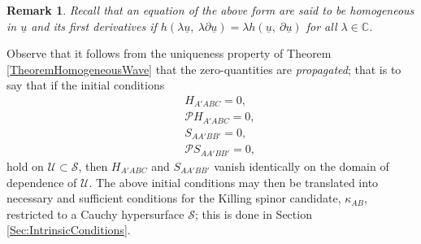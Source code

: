 \documentclass[10pt,a4paper]{article}
\theoremstyle{plain}
\newtheorem{remark}{Remark}
\begin{document}
\begin{remark}
\emph{ Recall that an equation of the
above form are said to be \textit{homogeneous in} $\underline{u}$
\textit{and its first derivatives} if
$h\left(\lambda\underline{u},~\lambda\partial\underline{u}\right)=\lambda
h\left(\underline{u},~\partial\underline{u}\right)$ for all
$\lambda\in\mathbb{C}$. }
\end{remark}

Observe that  it follows from the
uniqueness property of Theorem \ref{TheoremHomogeneousWave} that the
zero-quantities are \emph{propagated}; that is to say that if the
initial conditions
\begin{eqnarray*}
&& H_{A'ABC}=0,\\ && \mathcal{P} H_{A'ABC}=0,\\ &&
  S_{AA'BB'}=0,\\ &&\mathcal{P} S_{AA'BB'}=0,
\end{eqnarray*} 
hold on $\mathcal{U}\subset\mathcal{S}$, then $H_{A'ABC}$ and
$S_{AA'BB'}$ vanish identically on the domain of dependence of
$\mathcal{U}$. The above initial conditions may then be translated
into necessary and sufficient conditions for the Killing spinor
candidate, $\kappa_{AB}$, restricted to a Cauchy hypersurface
$\mathcal{S}$; this is done in Section
\ref{Sec:IntrinsicConditions}.
\end{document}
